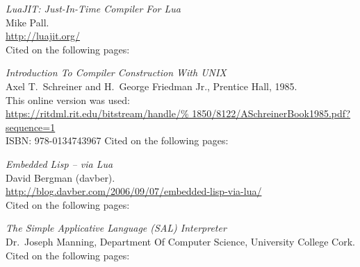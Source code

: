 \begin{thebibliography}{99}
  \emph{LuaJIT: Just-In-Time Compiler For Lua} \\
  Mike Pall. \\
  \url{http://luajit.org/} \\
  Cited on the following pages:

  \emph{Introduction To Compiler Construction With UNIX} \\
  Axel T.\ Schreiner and H.\ George Friedman Jr.,
  Prentice Hall,
  1985. \\
  This online version was used: \\
  \url{https://ritdml.rit.edu/bitstream/handle/%
       1850/8122/ASchreinerBook1985.pdf?sequence=1} \\
  ISBN: 978-0134743967
  Cited on the following pages:

  \emph{Embedded Lisp -- via Lua} \\
  David Bergman (davber). \\
  \url{http://blog.davber.com/2006/09/07/embedded-lisp-via-lua/} \\
  Cited on the following pages: 
  
  \emph{The Simple Applicative Language (SAL) Interpreter} \\
  Dr.\ Joseph Manning,
  Department Of Computer Science,
  University College Cork. \\
  Cited on the following pages: 

\end{thebibliography}
